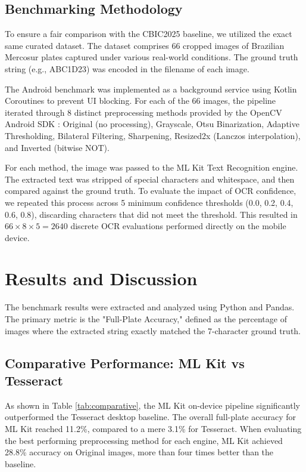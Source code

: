 \documentclass[conference]{IEEEtran}
\begin{document}
\subsection{Benchmarking Methodology}
To ensure a fair comparison with the CBIC2025 baseline, we utilized the exact same curated dataset. The dataset comprises 66 cropped images of Brazilian Mercosur plates captured under various real-world conditions. The ground truth string (e.g., ABC1D23) was encoded in the filename of each image.

The Android benchmark was implemented as a background service using Kotlin Coroutines to prevent UI blocking. For each of the 66 images, the pipeline iterated through 8 distinct preprocessing methods provided by the OpenCV Android SDK \cite{bradski2000opencv}: Original (no processing), Grayscale, Otsu Binarization, Adaptive Thresholding, Bilateral Filtering, Sharpening, Resized2x (Lanczos interpolation), and Inverted (bitwise NOT).

For each method, the image was passed to the ML Kit Text Recognition engine. The extracted text was stripped of special characters and whitespace, and then compared against the ground truth. To evaluate the impact of OCR confidence, we repeated this process across 5 minimum confidence thresholds (0.0, 0.2, 0.4, 0.6, 0.8), discarding characters that did not meet the threshold. This resulted in $66 \times 8 \times 5 = 2640$ discrete OCR evaluations performed directly on the mobile device.

\section{Results and Discussion}
\label{sec:results}
The benchmark results were extracted and analyzed using Python and Pandas. The primary metric is the "Full-Plate Accuracy," defined as the percentage of images where the extracted string exactly matched the 7-character ground truth.

\subsection{Comparative Performance: ML Kit vs Tesseract}

As shown in Table \ref{tab:comparative}, the ML Kit on-device pipeline significantly outperformed the Tesseract desktop baseline. The overall full-plate accuracy for ML Kit reached 11.2\%, compared to a mere 3.1\% for Tesseract. When evaluating the best performing preprocessing method for each engine, ML Kit achieved 28.8\% accuracy on Original images, more than four times better than the baseline.
\end{document}
